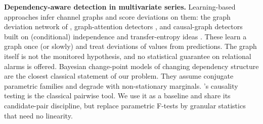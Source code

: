 \documentclass[11pt,a4paper]{article}
\begin{document}
\textbf{Dependency-aware detection in multivariate series.} Learning-based
approaches infer channel graphs and score deviations on them: the graph
deviation network of \citet{deng2021gdn}, graph-attention detectors
\citep{zhao2020mtadgat}, and causal-graph detectors built on (conditional)
independence and transfer-entropy ideas \citep{runge2019pcmci}. These learn a
graph once
(or slowly) and treat deviations of values from predictions. The graph itself
is not the monitored hypothesis, and no statistical guarantee on relational
alarms is offered. Bayesian change-point models of changing dependency
structure \citep{xuan2007changing} are the closest classical statement of our
problem. They assume conjugate parametric families and degrade with
non-stationary marginals. \citet{granger1969}'s causality testing is the
classical pairwise tool. We use it as a baseline and share its candidate-pair
discipline, but replace parametric F-tests by granular statistics that need no
linearity.
\end{document}
